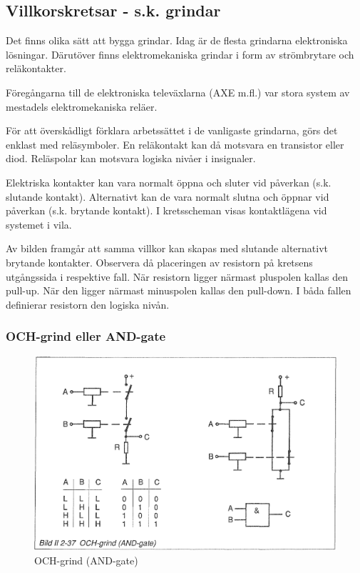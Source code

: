 \subsection{Villkorskretsar - s.k. grindar}

Det finns olika sätt att bygga grindar. Idag är de flesta grindarna elektroniska
lösningar. Därutöver finns elektromekaniska grindar i form av strömbrytare och
reläkontakter.

Föregångarna till de elektroniska televäxlarna (AXE m.fl.) var stora system av
mestadels elektromekaniska reläer.

För att överskådligt förklara arbetssättet i de vanligaste grindarna, görs det
enklast med reläsymboler. En reläkontakt kan då motsvara en transistor eller
diod. Reläspolar kan motsvara logiska nivåer i insignaler.

Elektriska kontakter kan vara normalt öppna och sluter vid påverkan (s.k.
slutande kontakt). Alternativt kan de vara normalt slutna och öppnar vid
påverkan (s.k. brytande kontakt). I kretsscheman visas kontaktlägena vid
systemet i vila.

Av bilden framgår att samma villkor kan skapas med slutande alternativt brytande
kontakter. Observera då placeringen av resistorn på kretsens utgångssida i
respektive fall. När resistorn ligger närmast pluspolen kallas den pull-up. När
den ligger närmast minuspolen kallas den pull-down. I båda fallen definierar
resistorn den logiska nivån.

\subsubsection{OCH-grind eller AND-gate}

\begin{figure}[h]
\begin{center}
\includegraphics[width=14cm]{images/bild_2_2-37}
\caption{OCH-grind (AND-gate)}
\label{fig:BildII2-37}
\end{center}
\end{figure}

